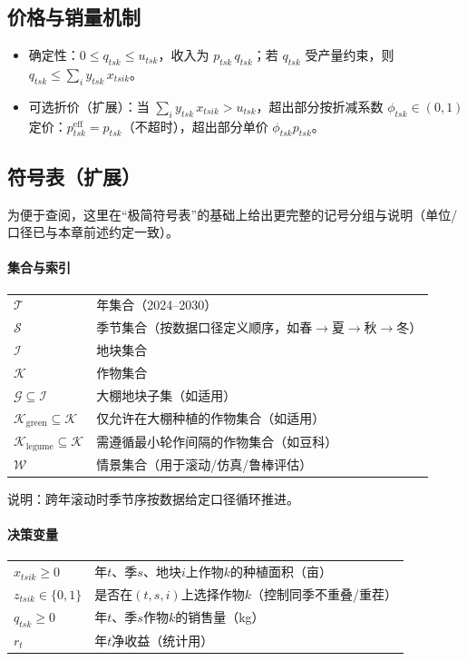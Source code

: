 \subsection{价格与销量机制}
\begin{itemize}
  \item 确定性：$0\le q_{tsk}\le u_{tsk}$，收入为 $p_{tsk}\,q_{tsk}$；若 $q_{tsk}$ 受产量约束，则 $q_{tsk}\le \sum_i y_{tsk}\,x_{tsik}$。
  \item 可选折价（扩展）：当 $\sum_i y_{tsk}\,x_{tsik}>u_{tsk}$，超出部分按折减系数 $\phi_{tsk}\in(0,1)$ 定价：$p_{tsk}^{\mathrm{eff}}=p_{tsk}$（不超时），超出部分单价 $\phi_{tsk}p_{tsk}$。
\end{itemize}

\subsection{符号表（扩展）}\label{sec:assumptions-symbols}
为便于查阅，这里在“极简符号表”的基础上给出更完整的记号分组与说明（单位/口径已与本章前述约定一致）。

\paragraph{集合与索引}
\begin{table}[H]\centering
\begin{tabular}{@{}ll@{}}\toprule
\(\mathcal{T}\) & 年集合（2024--2030） \\
\(\mathcal{S}\) & 季节集合（按数据口径定义顺序，如春\(\to\)夏\(\to\)秋\(\to\)冬） \\
\(\mathcal{I}\) & 地块集合 \\
\(\mathcal{K}\) & 作物集合 \\
\(\mathcal{G}\subseteq\mathcal{I}\) & 大棚地块子集（如适用） \\
\(\mathcal{K}_{\mathrm{green}}\subseteq\mathcal{K}\) & 仅允许在大棚种植的作物集合（如适用） \\
\(\mathcal{K}_{\mathrm{legume}}\subseteq\mathcal{K}\) & 需遵循最小轮作间隔的作物集合（如豆科） \\
\(\mathcal{W}\) & 情景集合（用于滚动/仿真/鲁棒评估） \\
\bottomrule\end{tabular}
\end{table}
\noindent 说明：跨年滚动时季节序按数据给定口径循环推进。

\paragraph{决策变量}
\begin{table}[H]\centering
\begin{tabular}{@{}ll@{}}\toprule
\(x_{t s i k}\ge 0\) & 年\(t\)、季\(s\)、地块\(i\)上作物\(k\)的种植面积（亩） \\
\(z_{t s i k}\in\{0,1\}\) & 是否在\((t,s,i)\)上选择作物\(k\)（控制同季不重叠/重茬） \\
\(q_{t s k}\ge 0\) & 年\(t\)、季\(s\)作物\(k\)的销售量（kg） \\
\(r_t\) & 年\(t\)净收益（统计用） \\
\bottomrule\end{tabular}
\end{table}

